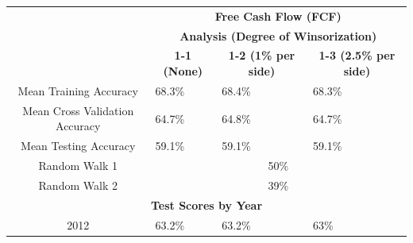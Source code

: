 {{\begin{table}[]
\centering
\begin{tabular}{clll}
\textbf{}                                            & \multicolumn{3}{c}{\textbf{Free Cash Flow (FCF)}}                                                                                                        \\ \cline{2-4} 
\multicolumn{1}{c|}{}                                & \multicolumn{3}{c|}{\textbf{Analysis (Degree of Winsorization)}}                                                                                         \\ \cline{2-4} 
\multicolumn{1}{c|}{}                                & \multicolumn{1}{c|}{\textbf{1-1 (None)}} & \multicolumn{1}{c|}{\textbf{1-2 (1\% per side)}} & \multicolumn{1}{c|}{\textbf{1-3 (2.5\% per side)}} \\ \hline
\multicolumn{1}{|c|}{Mean Training Accuracy}         & \multicolumn{1}{l|}{68.3\%}                      & \multicolumn{1}{l|}{68.4\%}                      & \multicolumn{1}{l|}{68.3\%}                        \\ \hline
\multicolumn{1}{|c|}{Mean Cross Validation Accuracy} & \multicolumn{1}{l|}{64.7\%}                      & \multicolumn{1}{l|}{64.8\%}                      & \multicolumn{1}{l|}{64.7\%}                        \\ \hline
\multicolumn{1}{|c|}{Mean Testing Accuracy}          & \multicolumn{1}{l|}{59.1\%}                      & \multicolumn{1}{l|}{59.1\%}                      & \multicolumn{1}{l|}{59.1\%}                        \\ \hline
\multicolumn{1}{|c|}{Random Walk 1}                  & \multicolumn{3}{c|}{50\%}                                                                                                                                \\ \hline
\multicolumn{1}{|c|}{Random Walk 2}                  & \multicolumn{3}{c|}{39\%}                                                                                                                                \\ \hline
\multicolumn{4}{|c|}{\textbf{Test Scores by Year}}                                                                                                                                                              \\ \hline
\multicolumn{1}{|c|}{2012}                           & \multicolumn{1}{l|}{63.2\%}                      & \multicolumn{1}{l|}{63.2\%}                      & \multicolumn{1}{l|}{63\%}                          \\ \hline

\end{tabular}
\end{table}}}
